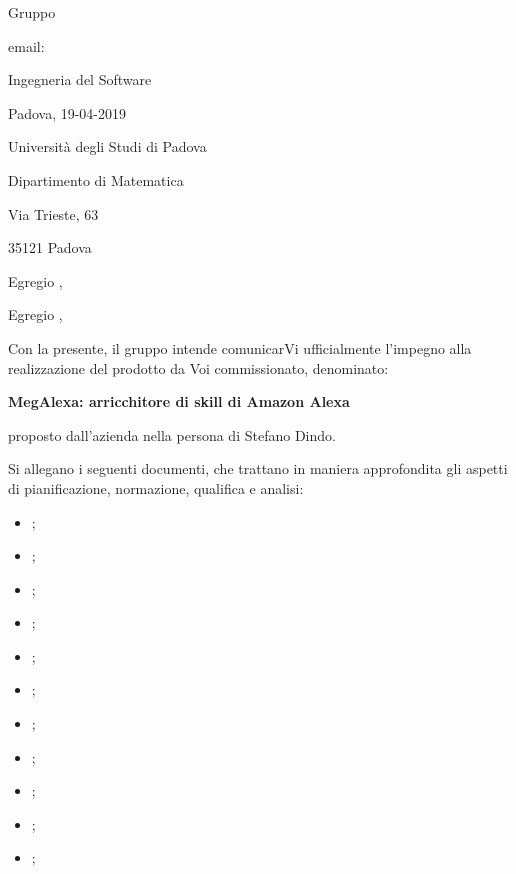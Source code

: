 \Large{Gruppo \textit{\groupName{}}}

\normalsize email: \groupEmail{}

\vspace{10pt}

\normalsize Ingegneria del Software

\vspace{10pt}

Padova, 19-04-2019

\begin{flushright}
\commitNameM

\commitNameS
\vspace{10pt}

Università degli Studi di Padova

Dipartimento di Matematica

Via Trieste, 63

35121 Padova
\end{flushright}

\begin{flushleft}


Egregio \commitNameM{},

Egregio \commitNameS{},
\end{flushleft}

\indent Con la presente, il gruppo \groupName{} intende comunicarVi ufficialmente l'impegno
alla realizzazione del prodotto da Voi commissionato, denominato:

\begin{center} \large \textbf{MegAlexa: arricchitore di skill di Amazon Alexa} \end{center}

\noindent proposto dall'azienda \proposerName{} nella persona di Stefano Dindo.

\noindent Si allegano i seguenti documenti, che trattano in maniera approfondita gli aspetti di pianificazione, normazione, qualifica e analisi:
\begin{itemize}
\item \docNameVersionNdP{};
\item \docNameVersionPdQ{};
\item \docNameVersionPdP{};
\item \docNameVersionAdR{};
\item \docNameVersionSdF{};
\item \docNameVersionGlo{};
\item \VI{};
\item \VII{};
\item \VIII{};
\item \VE{};
\item \VEE{};

	
\end{itemize}


